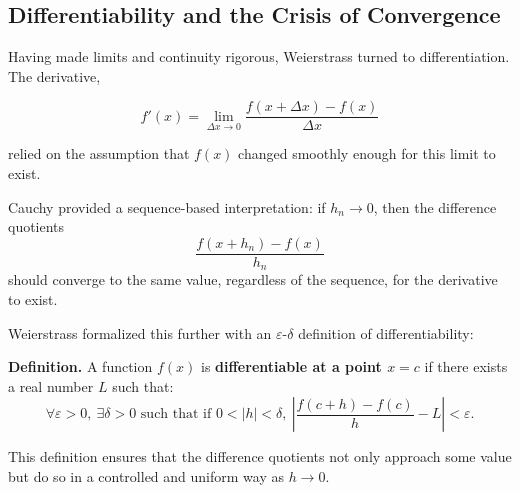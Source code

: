 \subsection{Differentiability and the Crisis of Convergence}

Having made limits and continuity rigorous, Weierstrass turned to differentiation. The derivative,

\[
f'(x) = \lim_{\Delta x \to 0} \frac{f(x + \Delta x) - f(x)}{\Delta x}
\]

relied on the assumption that \( f(x) \) changed smoothly enough for this limit to exist.

Cauchy provided a sequence-based interpretation: if \( h_n \to 0 \), then the difference quotients
\[
\frac{f(x + h_n) - f(x)}{h_n}
\]
should converge to the same value, regardless of the sequence, for the derivative to exist.

Weierstrass formalized this further with an \( \varepsilon \)-\( \delta \) definition of differentiability:

\vspace{0.5em}
\noindent\textbf{Definition.}
A function \( f(x) \) is \textbf{differentiable at a point \( x = c \)} if there exists a real number \( L \) such that:
\[
\forall \varepsilon > 0,\ \exists \delta > 0 \text{ such that if } 0 < |h| < \delta,\ \left|\frac{f(c + h) - f(c)}{h} - L\right| < \varepsilon.
\]
\vspace{1em}

This definition ensures that the difference quotients not only approach some value but do so in a controlled and uniform way as \( h \to 0 \).

